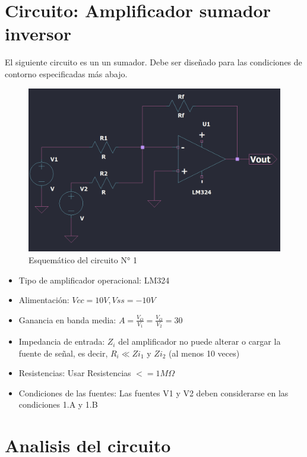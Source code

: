 \section{Circuito: Amplificador sumador inversor}

El siguiente circuito es un un sumador. Debe ser diseñado para las condiciones de contorno especificadas más abajo.

\begin{figure}[h!]
    \centering
    \includegraphics[width=0.90\linewidth]{img/esquematico_complete.png}
    \caption{Esquemático del circuito N° 1}
    \label{fig:esquematico}
\end{figure}

\begin{itemize}
  \item Tipo de amplificador operacional: LM324
  \item Alimentación: $Vcc = 10V, Vss = -10V$
  \item Ganancia en banda media: $A = \frac{V_O}{V_1} = \frac{V_O}{V_2} = 30$
  \item Impedancia de entrada: $Z_i$ del amplificador no puede alterar o cargar la fuente de señal, es decir, $R_i  \ll Zi_1$ y $Zi_2$ (al menos 10 veces)
  
  \item Resistencias: Usar Resistencias $<= 1M \Omega$
  \item Condiciones de las fuentes: Las fuentes V1 y V2 deben considerarse en las condiciones 1.A y 1.B

\end{itemize}





\section{Analisis del circuito}

